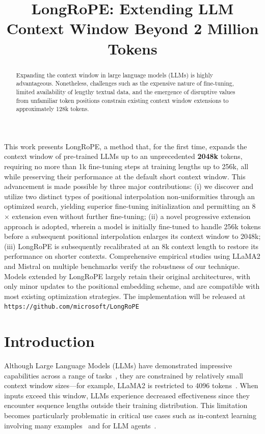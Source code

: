 \title{LongRoPE: Extending LLM Context Window Beyond 2 Million Tokens}

\begin{abstract}
Expanding the context window in large language models (LLMs) is highly advantageous. Nonetheless, challenges such as the expensive nature of fine-tuning, limited availability of lengthy textual data, and the emergence of disruptive values from unfamiliar token positions constrain existing context window extensions to approximately 128k tokens.
\end{abstract}

This work presents LongRoPE, a method that, for the first time, expands the context window of pre-trained LLMs up to an unprecedented \textbf{2048k} tokens, requiring no more than 1k fine-tuning steps at training lengths up to 256k, all while preserving their performance at the default short context window. This advancement is made possible by three major contributions: (i) we discover and utilize two distinct types of positional interpolation non-uniformities through an optimized search, yielding superior fine-tuning initialization and permitting an 8$\times$ extension even without further fine-tuning; (ii) a novel progressive extension approach is adopted, wherein a model is initially fine-tuned to handle 256k tokens before a subsequent positional interpolation enlarges its context window to 2048k; (iii) LongRoPE is subsequently recalibrated at an 8k context length to restore its performance on shorter contexts. Comprehensive empirical studies using LLaMA2 and Mistral on multiple benchmarks verify the robustness of our technique. Models extended by LongRoPE largely retain their original architectures, with only minor updates to the positional embedding scheme, and are compatible with most existing optimization strategies. The implementation will be released at \texttt{https://github.com/microsoft/LongRoPE}

\section{Introduction}

Although Large Language Models (LLMs) have demonstrated impressive capabilities across a range of tasks~\cite{gpt4,llama2}, they are constrained by relatively small context window sizes—for example, LLaMA2 is restricted to 4096 tokens~\cite{llama2}. When inputs exceed this window, LLMs experience decreased effectiveness since they encounter sequence lengths outside their training distribution. This limitation becomes particularly problematic in critical use cases such as in-context learning involving many examples~\cite{Huang2023FewerIM} and for LLM agents~\cite{park2023generative,madaan2023selfrefine}.

